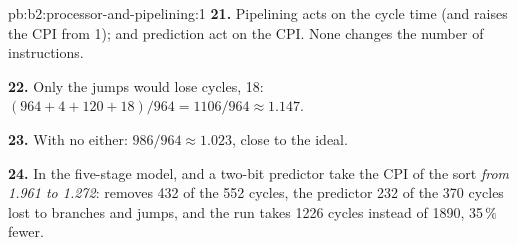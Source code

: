 \begin{solution}{pb:b2:processor-and-pipelining:1}
\textbf{21.} Pipelining acts on the cycle time (and raises the CPI from 1);  and prediction act on the CPI.
None changes the number of instructions.

\textbf{22.} Only the jumps would lose cycles, 18: $(964 + 4 + 120 + 18)/964 = 1106/964 \approx 1.147$.

\textbf{23.} With no  either: $986/964 \approx 1.023$, close to the ideal.

\textbf{24.} In the five-stage model,  and a two-bit predictor take the CPI of the  sort \emph{from
1.961 to 1.272}:  removes 432 of the 552  cycles, the predictor 232 of the 370 cycles lost to branches
and jumps, and the run takes 1226 cycles instead of 1890, 35\,\% fewer.
\end{solution}
